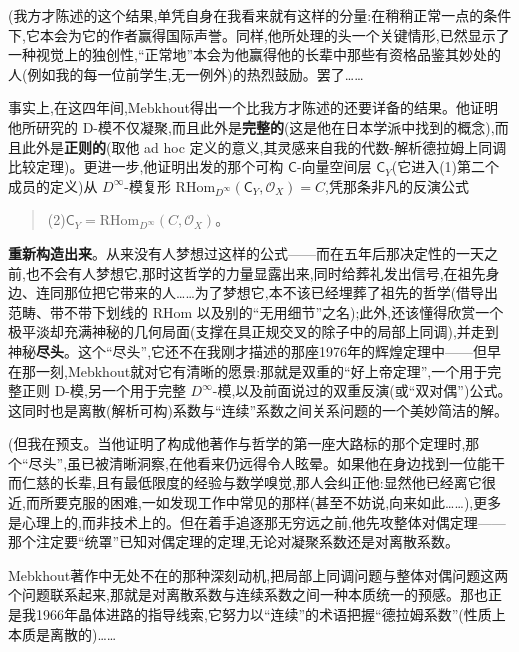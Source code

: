 \dmark{}(我方才陈述的这个结果,单凭自身在我看来就有这样的分量:在稍稍正常一点的条件下,它本会为它的作者赢得国际声誉。同样,他所处理的头一个关键情形,已然显示了一种视觉上的独创性,“正常地”本会为他赢得他的长辈中那些有资格品鉴其妙处的人(例如我的每一位前学生,无一例外)的热烈鼓励。罢了……

\noindent 事实上,在这四年间,Mebkhout得出一个比我方才陈述的还要详备的结果。他证明他所研究的 D-模不仅凝聚,而且此外是\textbf{完整的}(这是他在日本学派中找到的概念),而且此外是\textbf{正则的}(取他 ad hoc 定义的意义,其灵感来自我的代数-解析德拉姆上同调比较定理)。更进一步,他证明出发的那个可构 $\mathsf{C}$-向量空间层 $\mathsf{C}_{Y}$(它进入(1)第二个成员的定义)从 $D^{\infty}$-模复形 $\mathrm{RHom}_{D^{\infty}}(\mathsf{C}_{Y},\mathcal{O}_{X})=C$,凭那条非凡的反演公式
\begin{quote}
(2)\quad $\mathsf{C}_{Y}=\mathrm{RHom}_{D^{\infty}}(C,\mathcal{O}_{X})$。
\end{quote}
\textbf{重新构造出来}。从来没有人梦想过这样的公式——而在五年后那决定性的一天之前,也不会有人梦想它,那时这哲学的力量显露出来,同时给葬礼发出信号,在祖先身边、连同那位把它带来的人……为了梦想它,本不该已经埋葬了祖先的哲学(借导出范畴、带不带下划线的 $\mathrm{RHom}$ 以及别的“无用细节”之名);此外,还该懂得欣赏一个极平淡却充满神秘的几何局面(支撑在具正规交叉的除子中的局部上同调),并走到神秘\textbf{尽头}。这个“尽头”,它还不在我刚才描述的那座1976年的辉煌定理中——但早在那一刻,Mebkhout就对它有清晰的愿景:那就是双重的“好上帝定理”,一个用于完整正则 D-模,另一个用于完整 $D^{\infty}$-模,以及前面说过的双重反演(或“双对偶”)公式。这同时也是离散(解析可构)系数与“连续”系数之间关系问题的一个美妙简洁的解。

\dmark{}(但我在预支。当他证明了构成他著作与哲学的第一座大路标的那个定理时,那个“尽头”,虽已被清晰洞察,在他看来仍远得令人眩晕。如果他在身边找到一位能干而仁慈的长辈,且有最低限度的经验与数学嗅觉,那人会纠正他:显然他已经离它很近,而所要克服的困难,一如发现工作中常见的那样(甚至不妨说,向来如此……),更多是心理上的,而非技术上的。但在着手追逐那无穷远之前,他先攻整体对偶定理——那个注定要“统罩”已知对偶定理的定理,无论对凝聚系数还是对离散系数。

\noindent Mebkhout著作中无处不在的那种深刻动机,把局部上同调问题与整体对偶问题这两个问题联系起来,那就是对离散系数与连续系数之间一种本质统一的预感。那也正是我1966年晶体进路的指导线索,它努力以“连续”的术语把握“德拉姆系数”(性质上本质是离散的)……

